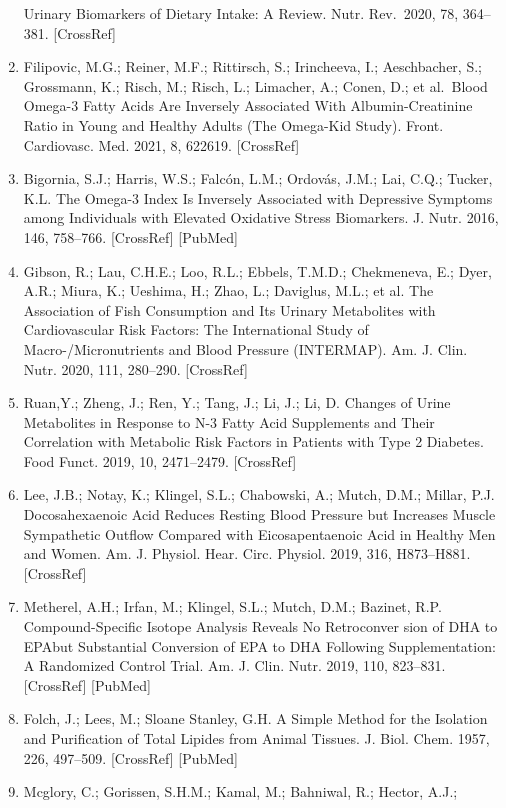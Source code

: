 \documentclass[journal=jacsat,manuscript=article]{achemso}
\begin{document}
\begin{enumerate}
  Urinary Biomarkers of Dietary Intake: A Review. Nutr. Rev.~2020, 78,
  364--381. {[}CrossRef{]}
\item
  Filipovic, M.G.; Reiner, M.F.; Rittirsch, S.; Irincheeva, I.;
  Aeschbacher, S.; Grossmann, K.; Risch, M.; Risch, L.; Limacher, A.;
  Conen, D.; et al.~Blood Omega-3 Fatty Acids Are Inversely Associated
  With Albumin-Creatinine Ratio in Young and Healthy Adults (The
  Omega-Kid Study). Front. Cardiovasc. Med. 2021, 8, 622619.
  {[}CrossRef{]}
\item
  Bigornia, S.J.; Harris, W.S.; Falcón, L.M.; Ordovás, J.M.; Lai, C.Q.;
  Tucker, K.L. The Omega-3 Index Is Inversely Associated with Depressive
  Symptoms among Individuals with Elevated Oxidative Stress Biomarkers.
  J. Nutr. 2016, 146, 758--766. {[}CrossRef{]} {[}PubMed{]}
\item
  Gibson, R.; Lau, C.H.E.; Loo, R.L.; Ebbels, T.M.D.; Chekmeneva, E.;
  Dyer, A.R.; Miura, K.; Ueshima, H.; Zhao, L.; Daviglus, M.L.; et al.
  The Association of Fish Consumption and Its Urinary Metabolites with
  Cardiovascular Risk Factors: The International Study of
  Macro-/Micronutrients and Blood Pressure (INTERMAP). Am. J. Clin.
  Nutr. 2020, 111, 280--290. {[}CrossRef{]}
\item
  Ruan,Y.; Zheng, J.; Ren, Y.; Tang, J.; Li, J.; Li, D. Changes of Urine
  Metabolites in Response to N-3 Fatty Acid Supplements and Their
  Correlation with Metabolic Risk Factors in Patients with Type 2
  Diabetes. Food Funct. 2019, 10, 2471--2479. {[}CrossRef{]}
\item
  Lee, J.B.; Notay, K.; Klingel, S.L.; Chabowski, A.; Mutch, D.M.;
  Millar, P.J. Docosahexaenoic Acid Reduces Resting Blood Pressure but
  Increases Muscle Sympathetic Outflow Compared with Eicosapentaenoic
  Acid in Healthy Men and Women. Am. J. Physiol. Hear. Circ. Physiol.
  2019, 316, H873--H881. {[}CrossRef{]}
\item
  Metherel, A.H.; Irfan, M.; Klingel, S.L.; Mutch, D.M.; Bazinet, R.P.
  Compound-Specific Isotope Analysis Reveals No Retroconver sion of DHA
  to EPAbut Substantial Conversion of EPA to DHA Following
  Supplementation: A Randomized Control Trial. Am. J. Clin. Nutr. 2019,
  110, 823--831. {[}CrossRef{]} {[}PubMed{]}
\item
  Folch, J.; Lees, M.; Sloane Stanley, G.H. A Simple Method for the
  Isolation and Purification of Total Lipides from Animal Tissues. J.
  Biol. Chem. 1957, 226, 497--509. {[}CrossRef{]} {[}PubMed{]}
\item
  Mcglory, C.; Gorissen, S.H.M.; Kamal, M.; Bahniwal, R.; Hector, A.J.;

\end{enumerate}
\end{document}
